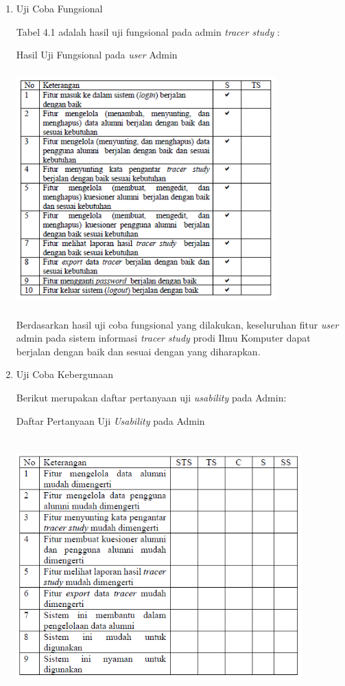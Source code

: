 \begin{enumerate}
	\item Uji Coba Fungsional
	
	Tabel 4.1 adalah hasil uji fungsional pada admin \textit{tracer study} :
	
	\begin{table}[H]
		\centering
		\caption{Hasil Uji Fungsional pada \textit{user} Admin}
		\includegraphics[width=10cm,height=9cm]{gambar/UAT/f_admin}
		\label{f_admin}
	\end{table}

Berdasarkan hasil uji coba fungsional yang dilakukan, keseluruhan fitur \textit{user} admin pada  sistem informasi \textit{tracer study} prodi Ilmu Komputer dapat berjalan dengan baik dan sesuai dengan yang diharapkan.
	
	\item Uji Coba Kebergunaan
	
	Berikut merupakan daftar pertanyaan uji \textit{usability} pada Admin:
	
	\begin{table}[H]
		\centering
		\caption{Daftar Pertanyaan Uji \textit{Usability} pada Admin}
		\includegraphics[width=11cm,height=10cm]{gambar/UAT/u_admin}
		\label{u_admin}
	\end{table}
	

\end{enumerate}
